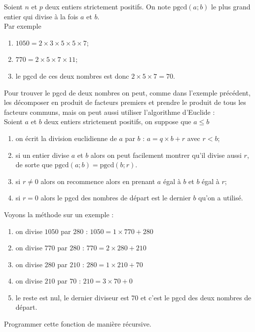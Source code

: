 \documentclass[a4paper,12pt,french]{article}
\begin{document}
\begin{exercice}
	Soient $n$ et $p$ deux entiers strictement positifs. On note $\mbox{pgcd}(a;b)$ le plus grand entier qui divise à la fois $a$ et $b$.\\
	Par exemple
	\begin{enumerate}[--]
		\item 	$1050 = 2\times 3\times	5\times 5\times 7$;
		\item 	$770=2\times 5\times 7\times 11$;
		\item 	le pgcd de ces deux nombres est donc $2\times 5\times 7 =70$.
	\end{enumerate}
	Pour trouver le pgcd de deux nombres on peut, comme dans l'exemple précédent, les décomposer en produit de facteurs premiers et prendre le produit de tous les facteurs communs, mais on peut aussi utiliser l'algorithme d'Euclide :\\
	Soient $a$ et $b$ deux entiers strictement positifs, on suppose que $a\leqslant b$
	\begin{enumerate}[--]
		\item on écrit la division euclidienne de $a$ par $b$ : $a=q\times b + r$ avec $r<b$;
		\item si un entier divise $a$ et $b$ alors on peut facilement montrer qu'il divise aussi $r$, de sorte que $\mbox{pgcd}(a;b)=\mbox{pgcd}(b;r)$.
		\item si $r\neq 0$ alors on recommence alors en prenant $a$ égal à $b$ et $b$ égal à $r$;
		\item si $r=0$ alors le pgcd des nombres de départ est le dernier $b$ qu'on a utilisé.
	\end{enumerate}
	Voyons la méthode sur un exemple :
	\begin{enumerate}[--]
		\item 	on divise $1050$ par $280$ : $1050 = 1\times 770 + 280$
		\item 	on divise $770$ par $280$ : $770 = 2\times 280 + 210$
		\item 	on divise $280$ par $210$ : $280 = 1\times 210 + 70$
		\item 	on divise $210$ par $70$ : $210 = 3\times 70 + 0$
		\item 	le reste est nul, le dernier diviseur est 70 et c'est le pgcd des deux nombres de départ.
	\end{enumerate}
	Programmer cette fonction  de manière récursive.
\end{exercice}
\end{document}
